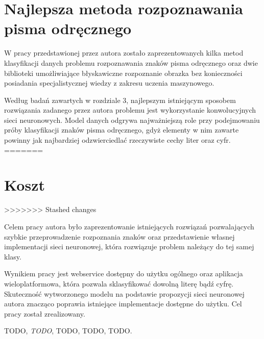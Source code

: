 \documentclass[brudnopis]{xmgr}
\begin{document}
\section{Najlepsza metoda rozpoznawania pisma odręcznego}

W pracy przedstawionej przez autora zostało zaprezentowanych kilka metod klasyfikacji danych problemu rozpoznawania znaków pisma odręcznego oraz dwie biblioteki umożliwiające błyskawiczne rozpoznanie obrazka bez konieczności posiadania specjalistycznej wiedzy z zakresu uczenia maszynowego.

Według badań zawartych w rozdziale 3, najlepszym istniejącym sposobem rozwiązania zadanego przez autora problemu jest wykorzystanie konwolucyjnych sieci neuronowych. Model danych odgrywa najważniejszą role przy podejmowaniu próby klasyfikacji znaków pisma odręcznego, gdyż elementy w nim zawarte powinny jak najbardziej odzwierciedlać rzeczywiste cechy liter oraz cyfr.
=======

\section{Koszt}
>>>>>>> Stashed changes

\summary

Celem pracy autora było zaprezentowanie istniejących rozwiązań pozwalających szybkie przeprowadzenie rozpoznania znaków oraz przedstawienie własnej implementacji sieci neuronowej, która rozwiązuje problem należący do tej samej klasy. 

Wynikiem pracy jest webservice dostępny do użytku ogólnego oraz aplikacja wieloplatformowa, która pozwala sklasyfikować dowolną literę bądź cyfrę. Skuteczność wytworzonego modelu na podstawie propozycji sieci neuronowej autora znacząco poprawia istniejące implementacje dostępne do użytku. Cel pracy został zrealizowany.




\begin{thebibliography}{9}

  TODO,
  \emph{TODO},
  TODO,
  TODO,
  TODO.

\end{thebibliography}

\oswiadczenie
\end{document}
